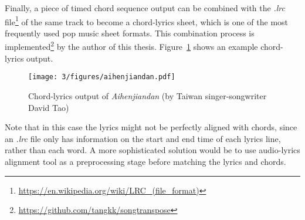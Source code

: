 Finally, a piece of timed chord sequence output can be combined with the \textit{.lrc} file\footnote{\url{https://en.wikipedia.org/wiki/LRC\_(file\_format)}} of the same track to become a chord-lyrics sheet, which is one of the most frequently used pop music sheet formats. This combination process is implemented\footnote{\url{https://github.com/tangkk/songtranspose}} by the author of this thesis. Figure~\ref{fig:3-aihenjiandan} shows an example chord-lyrics output.
\begin{figure}[h]
    \centering
        \texttt{[image: 3/figures/aihenjiandan.pdf]}
    \caption{Chord-lyrics output of \textit{Aihenjiandan} (by Taiwan singer-songwriter David Tao)}
    \label{fig:3-aihenjiandan}
\end{figure}
Note that in this case the lyrics might not be perfectly aligned with chords, since an \textit{.lrc} file only has information on the start and end time of each lyrics line, rather than each word. A more sophisticated solution would be to use audio-lyrics alignment tool \cite{mauch2010lyrics} as a preprocessing stage before matching the lyrics and chords.



